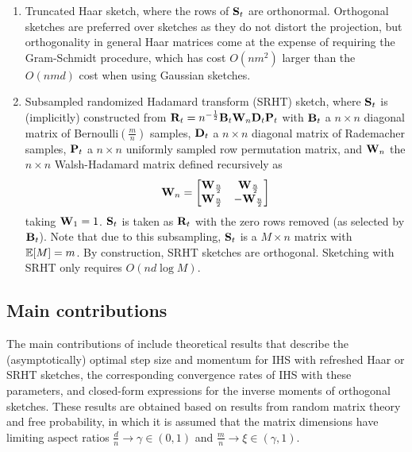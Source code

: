 \begin{enumerate}

\item
Truncated Haar sketch, where the rows of $\mathbf{S}_t$ are orthonormal. Orthogonal sketches are preferred over \iid sketches as they do not distort the projection, but orthogonality in general Haar matrices come at the expense of requiring the Gram-Schmidt procedure, which has cost $O(nm^2)$ larger than the $O(nmd)$ cost when using Gaussian sketches.

\item
Subsampled randomized Hadamard transform (SRHT) sketch, where $\mathbf{S}_t$ is (implicitly) constructed from $\mathbf{R}_t=n^{-\frac{1}{2}}\mathbf{B}_t\mathbf{W}_n\mathbf{D}_t\mathbf{P}_t$ with $\mathbf{B}_t$ a $n\times n$ diagonal matrix of \iid Bernoulli$\left(\frac{m}{n}\right)$ samples, $\mathbf{D}_t$ a $n\times n$ diagonal matrix of \iid Rademacher samples, $\mathbf{P}_t$ a $n\times n$ uniformly sampled row permutation matrix, and $\mathbf{W}_n$ the $n\times n$ Walsh-Hadamard matrix defined recursively as
\[
\mathbf{W}_n =
\begin{bmatrix}
\mathbf{W}_\frac{n}{2} & \mathbf{W}_\frac{n}{2} \\
\mathbf{W}_\frac{n}{2} & -\mathbf{W}_\frac{n}{2}
\end{bmatrix}
\]
taking $\mathbf{W}_1=1$. $\mathbf{S}_t$ is taken as $\mathbf{R}_t$ with the zero rows removed (as selected by $\mathbf{B}_t$). Note that due to this subsampling, $\mathbf{S}_t$ is a $M\times n$ matrix with $\mathbb{E}[M]=m$. By construction, SRHT sketches are orthogonal. Sketching with SRHT only requires $O(nd\log M)$.

\end{enumerate}


\subsection{Main contributions}

The main contributions of \citet{Lacotte:2020} include theoretical results that describe the (asymptotically) optimal step size and momentum for IHS with refreshed Haar or SRHT sketches, the corresponding convergence rates of IHS with these parameters, and closed-form expressions for the inverse moments of orthogonal sketches. These results are obtained based on results from random matrix theory and free probability, in which it is assumed that the matrix dimensions have limiting aspect ratios $\frac{d}{n}\rightarrow\gamma\in(0,1)$ and $\frac{m}{n}\rightarrow\xi\in(\gamma,1)$.
\\


